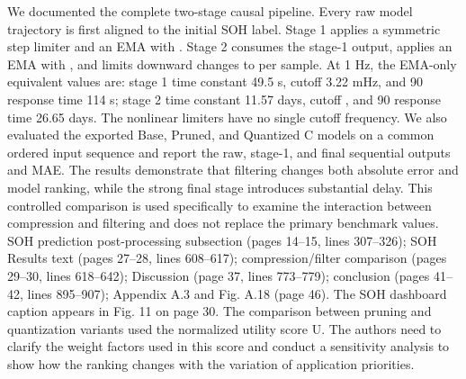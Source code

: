 {} We documented the complete two-stage causal pipeline. Every raw model trajectory is first aligned to the initial SOH label. Stage 1 applies a symmetric step limiter and an EMA with . Stage 2 consumes the stage-1 output, applies an EMA with , and limits downward changes to  per sample. At 1 Hz, the EMA-only equivalent values are: stage 1 time constant 49.5 s, cutoff 3.22 mHz, and 90\markdownRendererPercentSign{} response time 114 s; stage 2 time constant 11.57 days, cutoff , and 90\markdownRendererPercentSign{} response time 26.65 days. The nonlinear limiters have no single cutoff frequency.\markdownRendererParagraphSeparator
{}We also evaluated the exported Base, Pruned, and Quantized C models on a common ordered input sequence and report the raw, stage-1, and final sequential outputs and MAE. The results demonstrate that filtering changes both absolute error and model ranking, while the strong final stage introduces substantial delay. This controlled comparison is used specifically to examine the interaction between compression and filtering and does not replace the primary benchmark values.\markdownRendererParagraphSeparator
{} SOH prediction post-processing subsection (pages 14--15, lines 307--326); SOH Results text (pages 27--28, lines 608--617); compression/filter comparison (pages 29--30, lines 618--642); Discussion (page 37, lines 773--779); conclusion (pages 41--42, lines 895--907); Appendix A.3 and Fig. A.18 (page 46). The SOH dashboard caption appears in Fig. 11 on page 30.\markdownRendererInterblockSeparator
{}
\markdownRendererSectionEnd \markdownRendererSectionBegin
{}\markdownRendererInterblockSeparator
{}\markdownRendererBlockQuoteBegin
The comparison between pruning and quantization variants used the normalized utility score U. The authors need to clarify the weight factors used in this score and conduct a sensitivity analysis to show how the ranking changes with the variation of application priorities.\markdownRendererBlockQuoteEnd \markdownRendererInterblockSeparator
